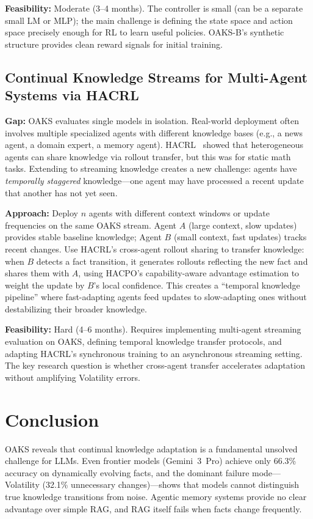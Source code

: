 \documentclass[11pt]{article}
\begin{document}
\textbf{Feasibility:} Moderate (3--4 months). The controller is small (can be a separate small LM or MLP); the main challenge is defining the state space and action space precisely enough for RL to learn useful policies. OAKS-B's synthetic structure provides clean reward signals for initial training.

\subsection{Continual Knowledge Streams for Multi-Agent Systems via HACRL}

\textbf{Gap:} OAKS evaluates single models in isolation. Real-world deployment often involves multiple specialized agents with different knowledge bases (e.g., a news agent, a domain expert, a memory agent). HACRL~\citep{zhang2026hacrl} showed that heterogeneous agents can share knowledge via rollout transfer, but this was for static math tasks. Extending to streaming knowledge creates a new challenge: agents have \emph{temporally staggered} knowledge---one agent may have processed a recent update that another has not yet seen.

\textbf{Approach:} Deploy $n$ agents with different context windows or update frequencies on the same OAKS stream. Agent $A$ (large context, slow updates) provides stable baseline knowledge; Agent $B$ (small context, fast updates) tracks recent changes. Use HACRL's cross-agent rollout sharing to transfer knowledge: when $B$ detects a fact transition, it generates rollouts reflecting the new fact and shares them with $A$, using HACPO's capability-aware advantage estimation to weight the update by $B$'s local confidence. This creates a ``temporal knowledge pipeline'' where fast-adapting agents feed updates to slow-adapting ones without destabilizing their broader knowledge.

\textbf{Feasibility:} Hard (4--6 months). Requires implementing multi-agent streaming evaluation on OAKS, defining temporal knowledge transfer protocols, and adapting HACRL's synchronous training to an asynchronous streaming setting. The key research question is whether cross-agent transfer accelerates adaptation without amplifying Volatility errors.

\section{Conclusion}

OAKS reveals that continual knowledge adaptation is a fundamental unsolved challenge for LLMs. Even frontier models (Gemini~3~Pro) achieve only 66.3\% accuracy on dynamically evolving facts, and the dominant failure mode---Volatility (32.1\% unnecessary changes)---shows that models cannot distinguish true knowledge transitions from noise. Agentic memory systems provide no clear advantage over simple RAG, and RAG itself fails when facts change frequently.
\end{document}
